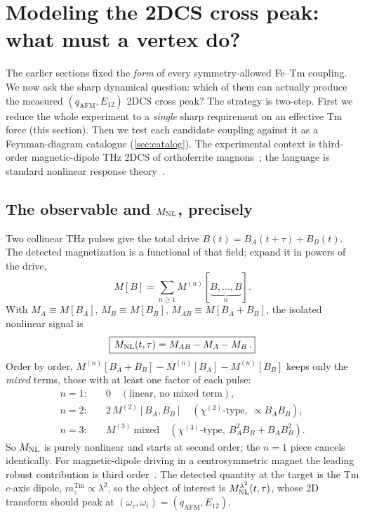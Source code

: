 \documentclass[11pt,a4paper]{article}
\newcommand{\Tm}{\mathrm{Tm}}
\begin{document}
\section{Modeling the 2DCS cross peak: what must a vertex do?}
\label{sec:mechanism}

The earlier sections fixed the \emph{form} of every symmetry-allowed Fe--Tm
coupling.  We now ask the sharp dynamical question: which of them can actually
produce the measured $(q_{\mathrm{AFM}},E_{12})$ 2DCS cross peak?  The strategy
is two-step.  First we reduce the whole experiment to a \emph{single} sharp
requirement on an effective Tm force (this section).  Then we test each
candidate coupling against it as a Feynman-diagram catalogue
(\cref{sec:catalog}).  The experimental context is third-order magnetic-dipole
THz 2DCS of orthoferrite magnons~\cite{Lu2017}; the language is standard
nonlinear response theory~\cite{Mukamel}.

\subsection{The observable and $M_{\rm NL}$, precisely}

Two collinear THz pulses give the total drive $B(t)=B_A(t+\tau)+B_B(t)$.  The
detected magnetization is a functional of that field; expand it in powers of
the drive,
\begin{equation}
  M[B]=\sum_{n\ge1}M^{(n)}[\underbrace{B,\dots,B}_{n}].
\end{equation}
With $M_A\equiv M[B_A]$, $M_B\equiv M[B_B]$, $M_{AB}\equiv M[B_A+B_B]$, the
isolated nonlinear signal is
\begin{equation}
  \boxed{\,M_{\rm NL}(t,\tau)=M_{AB}-M_A-M_B\,.}
\end{equation}
Order by order, $M^{(n)}[B_A+B_B]-M^{(n)}[B_A]-M^{(n)}[B_B]$ keeps only the
\emph{mixed} terms, those with at least one factor of each pulse:
\begin{align}
  n=1:&\quad 0 \quad(\text{linear, no mixed term}),\\
  n=2:&\quad 2\,M^{(2)}[B_A,B_B] \quad(\chi^{(2)}\text{-type},\ \propto B_AB_B),\\
  n=3:&\quad M^{(3)}\ \text{mixed} \quad(\chi^{(3)}\text{-type},\ B_A^2B_B+B_AB_B^2).
\end{align}
So $M_{\rm NL}$ is purely nonlinear and starts at second order; the $n=1$ piece
cancels identically.  For magnetic-dipole driving in a centrosymmetric magnet
the leading robust contribution is third order~\cite{Lu2017}.  The detected
quantity at the target is the Tm $c$-axis dipole, $m_z^{\Tm}\propto\lambda^2$,
so the object of interest is $M_{\rm NL}^{\lambda^2}(t,\tau)$, whose 2D
transform should peak at $(\omega_\tau,\omega_t)=(q_{\mathrm{AFM}},E_{12})$.
\end{document}

